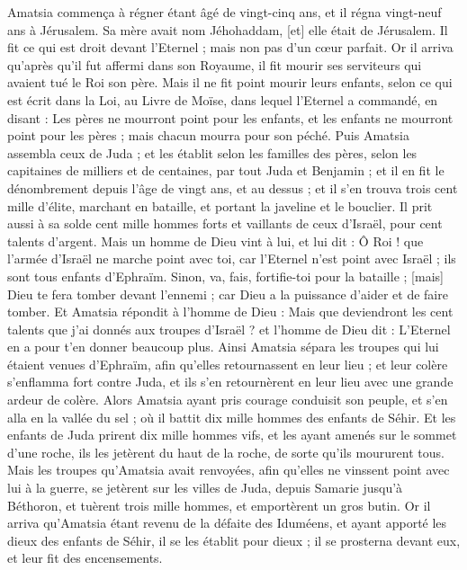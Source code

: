 \begin{multicols}{2}
\VerseOne{}Amatsia commença à régner étant âgé de vingt-cinq ans, et il régna vingt-neuf ans à Jérusalem. Sa mère avait nom Jéhohaddam, [et] elle était de Jérusalem.
Il fit ce qui est droit devant l'Eternel ; mais non pas d'un cœur parfait.
Or il arriva qu'après qu'il fut affermi dans son Royaume, il fit mourir ses serviteurs qui avaient tué le Roi son père.
Mais il ne fit point mourir leurs enfants, selon ce qui est écrit dans la Loi, au Livre de Moïse, dans lequel l'Eternel a commandé, en disant : Les pères ne mourront point pour les enfants, et les enfants ne mourront point pour les pères ; mais chacun mourra pour son péché.
Puis Amatsia assembla ceux de Juda ; et les établit selon les familles des pères, selon les capitaines de milliers et de centaines, par tout Juda et Benjamin ; et il en fit le dénombrement depuis l'âge de vingt ans, et au dessus ; et il s'en trouva trois cent mille d'élite, marchant en bataille, et portant la javeline et le bouclier.
Il prit aussi à sa solde cent mille hommes forts et vaillants de ceux d'Israël, pour cent talents d'argent.
Mais un homme de Dieu vint à lui, et lui dit : Ô Roi ! que l'armée d'Israël ne marche point avec toi, car l'Eternel n'est point avec Israël ; ils sont tous enfants d'Ephraïm.
Sinon, va, fais, fortifie-toi pour la bataille ; [mais] Dieu te fera tomber devant l'ennemi ; car Dieu a la puissance d'aider et de faire tomber.
Et Amatsia répondit à l'homme de Dieu : Mais que deviendront les cent talents que j'ai donnés aux troupes d'Israël ? et l'homme de Dieu dit : L'Eternel en a pour t'en donner beaucoup plus.
Ainsi Amatsia sépara les troupes qui lui étaient venues d'Ephraïm, afin qu'elles retournassent en leur lieu ; et leur colère s'enflamma fort contre Juda, et ils s'en retournèrent en leur lieu avec une grande ardeur de colère.
Alors Amatsia ayant pris courage conduisit son peuple, et s'en alla en la vallée du sel ; où il battit dix mille hommes des enfants de Séhir.
Et les enfants de Juda prirent dix mille hommes vifs, et les ayant amenés sur le sommet d'une roche, ils les jetèrent du haut de la roche, de sorte qu'ils moururent tous.
Mais les troupes qu'Amatsia avait renvoyées, afin qu'elles ne vinssent point avec lui à la guerre, se jetèrent sur les villes de Juda, depuis Samarie jusqu'à Béthoron, et tuèrent trois mille hommes, et emportèrent un gros butin.
Or il arriva qu'Amatsia étant revenu de la défaite des Iduméens, et ayant apporté les dieux des enfants de Séhir, il se les établit pour dieux ; il se prosterna devant eux, et leur fit des encensements.

\end{multicols}

